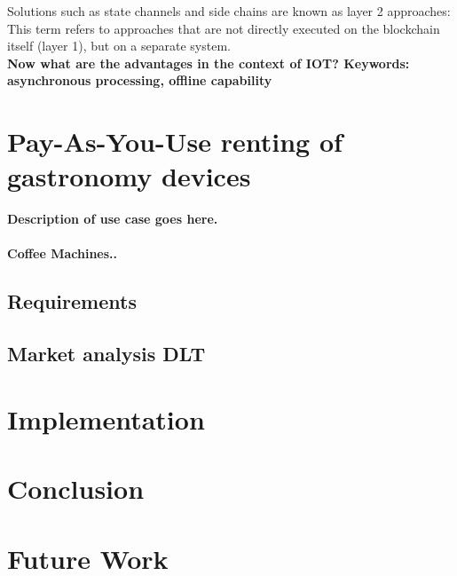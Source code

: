 \documentclass[conference]{IEEEtran}
\begin{document}
Solutions such as state channels and side chains are known as layer 2 approaches: This term refers to approaches that are not directly executed on the blockchain itself (layer 1), but on a separate system.\\
\textbf{Now what are the advantages in the context of IOT? Keywords: asynchronous processing, offline capability}


\section{Pay-As-You-Use renting of gastronomy devices}
\textbf{Description of use case goes here.}\\
\paragraph{Coffee Machines..}
\lipsum[1-1]

\subsection{Requirements}
\lipsum[1-1]

\subsection{Market analysis DLT}
\lipsum[1-1]

\section{Implementation}
\lipsum[1-1]


\section{Conclusion}
\lipsum[1-1]

\section{Future Work}
\lipsum[1-1]


\end{document}
